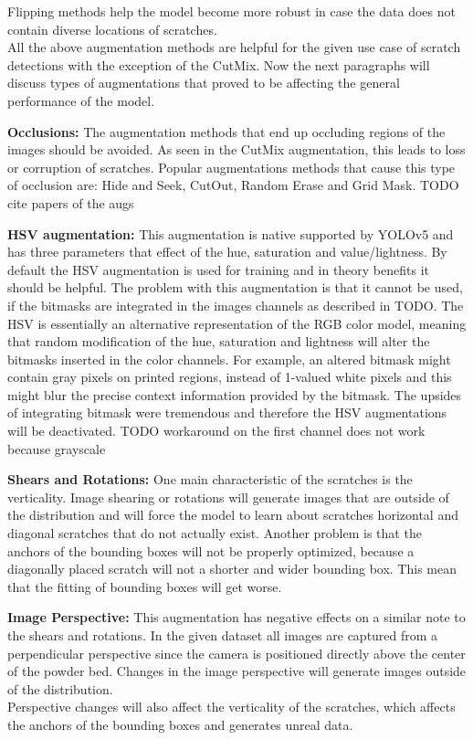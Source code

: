 Flipping methods help the model become more robust in case the data does not contain diverse locations of scratches. \\


All the above augmentation methods are helpful for the given use case of scratch detections with the exception of the CutMix. Now the next paragraphs will discuss types of augmentations that proved to be affecting the general performance of the model.

\textbf{Occlusions:} The augmentation methods that end up occluding regions of the images should be avoided. As seen in the CutMix augmentation, this leads to loss or corruption of scratches. Popular augmentations methods that cause this type of occlusion are: Hide and Seek, CutOut, Random Erase and Grid Mask. TODO cite papers of the augs

\textbf{HSV augmentation:} This augmentation is native supported by YOLOv5 and has three parameters that effect of the hue, saturation and value/lightness. By default the HSV augmentation is used for training and in theory benefits it should be helpful. The problem with this augmentation is that it cannot be used, if the bitmasks are integrated in the images channels as described in TODO. The HSV is essentially an alternative representation of the RGB color model, meaning that random modification of the hue, saturation and lightness will alter the bitmasks inserted in the color channels. For example, an altered bitmask might contain gray pixels on printed regions, instead of 1-valued white pixels and this might blur the precise context information provided by the bitmask. The upsides of integrating bitmask were tremendous and therefore the HSV augmentations will be deactivated.
TODO workaround on the first channel does not work because grayscale

\textbf{Shears and Rotations:} One main characteristic of the scratches is the verticality. Image shearing or rotations will generate images that are outside of the distribution and will force the model to learn about scratches horizontal and diagonal scratches that do not actually exist. Another problem is that the anchors of the bounding boxes will not be properly optimized, because a diagonally placed scratch will not a shorter and wider bounding box. This mean that the fitting of bounding boxes will get worse.

\textbf{Image Perspective:} This augmentation has negative effects on a similar note to the shears and rotations. In the given dataset all images are captured from a perpendicular perspective since the camera is positioned directly above the center of the powder bed. Changes in the image perspective will generate images outside of the distribution. \\
Perspective changes will also affect the verticality of the scratches, which affects the anchors of the bounding boxes and generates unreal data. \\

